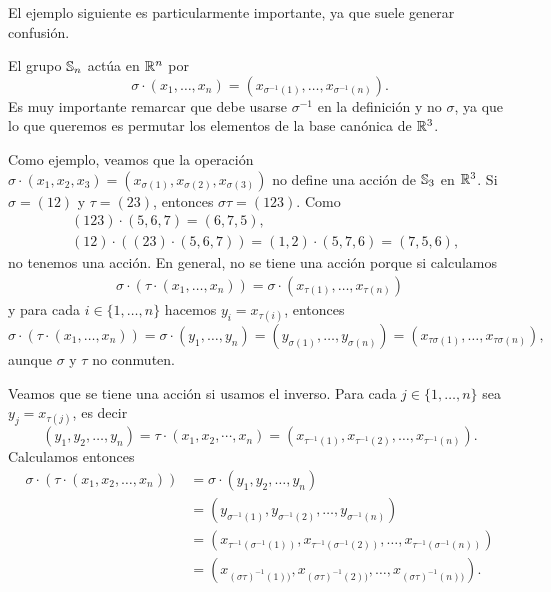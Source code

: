 El ejemplo siguiente es particularmente importante, ya que suele generar confusión.

\begin{example}
    El grupo $\mathbb{S}_n$ actúa en $\mathbb{R}^n$ por 
    \[
    \sigma\cdot (x_1,\dots,x_n)=(x_{\sigma^{-1}(1)},\dots,x_{\sigma^{-1}(n)}).
    \]
    Es muy importante remarcar que debe usarse $\sigma^{-1}$ en la definición y no $\sigma$, ya que lo que queremos
    es permutar los elementos de la base canónica de $\mathbb{R}^3$. 
    
    Como ejemplo, veamos que la operación 
    $\sigma\cdot (x_1,x_2,x_3)=(x_{\sigma(1)},x_{\sigma(2)},x_{\sigma(3)})$ 
    no define una acción de $\mathbb{S}_3$ en $\mathbb{R}^3$. 
    Si $\sigma=(12)$ y $\tau=(23)$, entonces $\sigma\tau=(123)$. Como 
    \begin{align*}
    &(123)\cdot (5,6,7)=(6,7,5),\\
    &(12)\cdot ((23)\cdot (5,6,7))=(1,2)\cdot (5,7,6)=(7,5,6),
    \end{align*}
    no tenemos una acción. En general, no se tiene una acción porque 
    si calculamos
    \begin{align*}
        \sigma\cdot (\tau\cdot (x_1,\dots,x_n))
        =\sigma\cdot (x_{\tau(1)},\dots,x_{\tau(n)})
    \end{align*}
    y para cada $i\in\{1,\dots,n\}$ hacemos $y_i=x_{\tau(i)}$, entonces
    \[
    \sigma\cdot (\tau\cdot (x_1,\dots,x_n))=\sigma\cdot (y_1,\dots,y_n)=(y_{\sigma(1)},\dots,y_{\sigma(n)})
    =(x_{\tau\sigma(1)},\dots,x_{\tau\sigma(n)}),
    \]
    aunque $\sigma$ y $\tau$ no conmuten. 
    
    Veamos que se tiene una acción si usamos el inverso. 
    Para cada $j\in\{1,\dots,n\}$ sea $y_j=x_{\tau(j)}$, 
    es decir 
    \[
    (y_1,y_2,\dots,y_n)=\tau\cdot (x_1,x_2,\cdots,x_n)=(x_{\tau^{-1}(1)},x_{\tau^{-1}(2)},\dots,x_{\tau^{-1}(n)}).
    \]
    Calculamos entonces 
    \begin{align*}
        \sigma\cdot (\tau\cdot (x_1,x_2,\dots,x_n))&=\sigma\cdot (y_1,y_2,\dots,y_n)\\
        &=\left(y_{\sigma^{-1}(1)},y_{\sigma^{-1}(2)},\dots,y_{\sigma^{-1}(n)}\right)\\
        &=\left(x_{\tau^{-1}(\sigma^{-1}(1))},x_{\tau^{-1}(\sigma^{-1}(2))},\dots,x_{\tau^{-1}(\sigma^{-1}(n))}\right)\\
        &=\left(x_{(\sigma\tau)^{-1}(1))},x_{(\sigma\tau)^{-1}(2))},\dots,x_{(\sigma\tau)^{-1}(n))}\right).
    \end{align*}
\end{example}

